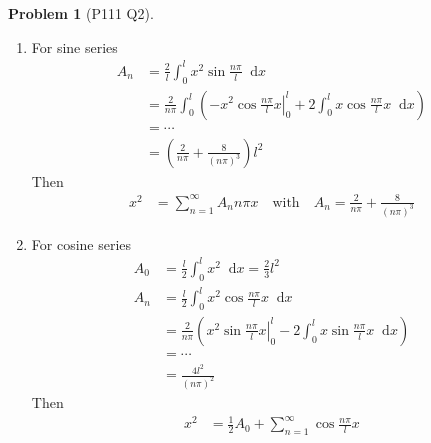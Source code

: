 \documentclass[twoside,11pt]{article}
\renewcommand*\d{\mathop{}\!\mathrm{d}}
\theoremstyle{definition}
\newtheorem{problem}{Problem}
\theoremstyle{remark}
\begin{document}
\begin{problem}[P111 Q2]\
\begin{enumerate}[label=(\alph*)]
\item For sine series
\begin{align*}
    A_n &= \frac{2}{l}\int_0^l x^2\sin\frac{n\pi}{l}\d x\\
    &=\frac{2}{n\pi}\int_0^l \left(
        \left.-x^2\cos\frac{n\pi}{l}x\right |_0^l 
        + 2\int_0^l x\cos\frac{n\pi}{l}x\d x
    \right)\\
    &= \cdots\\
    &= \left(\frac{2}{n\pi} + \frac{8}{(n\pi)^3}\right)l^2
\end{align*}
Then 
\begin{align*}
    x^2 &= \sum_{n=1}^\infty A_n n\pi x\quad\text{with}\quad
    A_n = \frac{2}{n\pi} + \frac{8}{(n\pi)^3}
\end{align*}

\item For cosine series
\begin{align*}
    A_0 &= \frac{l}{2}\int_0^l x^2\d x = \frac{2}{3}l^2\\
    A_n &= \frac{l}{2}\int_0^l x^2\cos\frac{n\pi}{l}x\d x\\
    &= \frac{2}{n\pi}\left(
        \left.x^2\sin\frac{n\pi}{l}x\right |_0^l
        -2\int_0^lx\sin\frac{n\pi}{l}x\d x
    \right)\\
    &=\cdots\\
    &= \frac{4l^2}{(n\pi)^2}
\end{align*}
Then 
\begin{align*}
    x^2 &= \frac{1}{2}A_0 + \sum_{n=1}^\infty\cos\frac{n\pi}{l}x
\end{align*}
\end{enumerate}
\end{problem}
\end{document}
